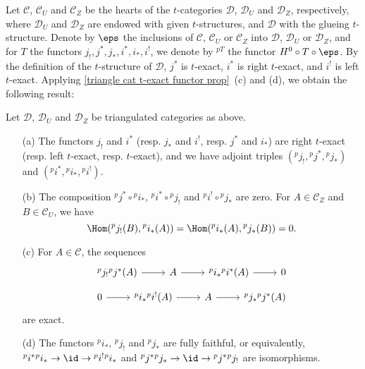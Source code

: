 Let $\mathcal{C}$, $\mathcal{C}_U$ and $\mathcal{C}_Z$ be the hearts of the $t$-categories $\mathcal{D}$, $\mathcal{D}_U$ and $\mathcal{D}_Z$, respectively, where $\mathcal{D}_U$ and $\mathcal{D}_Z$ are endowed with given $t$-structures, and $\mathcal{D}$ with the glueing $t$-structure. Denote by $\eps$ the inclusions of $\mathcal{C}$, $\mathcal{C}_U$ or $\mathcal{C}_Z$ into $\mathcal{D}$, $\mathcal{D}_U$ or $\mathcal{D}_Z$, and for $T$ the functors $j_!,j^*,j_*,i^*,i_*,i^!$, we denote by $^{pT}$ the functor $H^0\circ T\circ\eps$. By the definition of the $t$-structure of $\mathcal{D}$, $j^*$ is $t$-exact, $i^*$ is right $t$-exact, and $i^!$ is left $t$-exact. Applying \cref{triangle cat t-exact functor prop}~(c) and (d), we obtain the following result:
\begin{proposition}\label{triangle cat recollement functors composition and exact sequence}
Let $\mathcal{D}$, $\mathcal{D}_U$ and $\mathcal{D}_Z$ be triangulated categories as above.
\begin{enumerate}
    \item[(a)] The functors $j_!$ and $i^*$ (resp. $j_*$ and $i^!$, resp. $j^*$ and $i_*$) are right $t$-exact (resp. left $t$-exact, resp. $t$-exact), and we have adjoint triples $({^pj_!},{^pj^*},{^pj_*})$ and $({^pi^*},{^pi_*},{^pi^!})$.
    \item[(b)] The composition ${^pj^*}\circ{^pi_*}$, ${^pi^*}\circ{^pj_!}$ and ${^pi^!}\circ{^pj_*}$ are zero. For $A\in\mathcal{C}_Z$ and $B\in\mathcal{C}_U$, we have
\[\Hom({^pj_!}(B),{^pi_*}(A))=\Hom({^pi_*}(A),{^pj_*}(B))=0.\]
    \item[(c)] For $A\in\mathcal{C}$, the sequences
    \[\begin{tikzcd}
        {^pj_!}{^pj^*}(A)\ar[r]&A\ar[r]&{^pi_*}{^pi^*}(A)\ar[r]&0
    \end{tikzcd}\]
    \vspace*{-4mm}
    \[\begin{tikzcd}
        0\ar[r]&{^pi_*}{^pi^!}(A)\ar[r]&A\ar[r]&{^pj_*}{^pj^*}(A)
    \end{tikzcd}\]
    are exact.
    \item[(d)] The functors ${^pi_*}$, ${^pj_!}$ and ${^pj_*}$ are fully faithful, or equivalently, ${^pi^*}{^pi_*}\to\id\to{^pi^!}{^pi_*}$ and ${^pj^*}{^pj_*}\to\id\to{^pj^*}{^pj_!}$ are isomorphisms. 
\end{enumerate}
\end{proposition}

